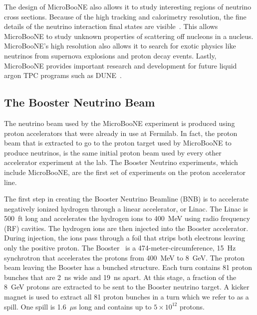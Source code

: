   The design of MicroBooNE also allows it to study interesting regions of
  neutrino cross sections. Because of the high tracking and calorimetry
  resolution, the fine details of the neutrino interaction final states are
  visible~\cite{Adams:2018fud}. This allows MicroBooNE to study unknown
  properties of scattering off nucleons in a nucleus.  MicroBooNE's high
  resolution also allows it to search for exotic physics like neutrinos from
  supernova explosions and proton decay events. Lastly, MicroBooNE provides
  important research and development for future liquid argon TPC programs such
  as DUNE~\cite{Diwan:2016gmz}.

\subsection{The Booster Neutrino Beam}\label{sec:beam}
  The neutrino beam used by the MicroBooNE experiment is produced using proton
  accelerators that were already in use at Fermilab. In fact, the proton beam
  that is extracted to go to the proton target used by MicroBooNE to produce
  neutrinos, is the same initial proton beam used by every other accelerator
  experiment at the lab. The Booster Neutrino experiments, which include
  MicroBooNE, are the first set of experiments on the proton accelerator line.

  The first step in creating the Booster Neutrino Beamline (BNB) is to
  accelerate negatively ionized hydrogen through a linear accelerator, or
  Linac. The Linac is 500~ft long and accelerates the hydrogen ions to 400~MeV
  using radio frequency (RF) cavities. The hydrogen ions are then injected into
  the Booster accelerator. During injection, the ions pass through a foil that
  strips both electrons leaving only the positive proton.  The
  Booster~\cite{Aguilar-Arevalo:2008yp} is a 474-meter-circumference, 15~Hz
  synchrotron that accelerates the protons from 400~MeV to 8~GeV. The proton
  beam leaving the Booster has a bunched structure. Each turn contains 81
  proton bunches that are 2~ns wide and 19~ns apart. At this stage, a fraction
  of the 8~GeV protons are extracted to be sent to the Booster neutrino target.
  A kicker magnet is used to extract all 81 proton bunches in a turn which we
  refer to as a spill. One spill is 1.6~$\mu$s long and contains up to $5\times
  10^{12}$ protons.

